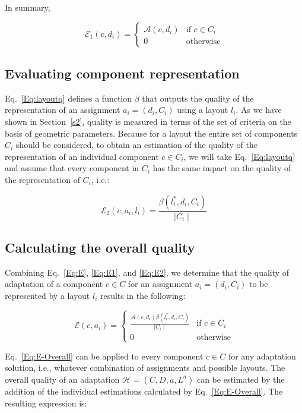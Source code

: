 In summary, 

\begin{equation} \label{Eq:E1}
\mathcal{E}_1(c,d_i)= \begin{cases}
\mathcal{A}(c,d_i) & \text{if $c \in C_i$} \\
0 & \text{otherwise}
\end{cases}
\end{equation}


\subsection{Evaluating component representation}

Eq.~\ref{Eq:layoutq} defines a function $\beta$ that outputs the quality of the representation of an assignment $a_i=(d_i,C_i)$ using a layout $l_i$. 
As we have shown in Section~\ref{s2}, quality is measured in terms of the set of criteria on the basis of geometric parameters. 
Because for a layout the entire set of components $C_i$ should be considered, to obtain an estimation of the quality of the representation of an individual component $c \in C_i$, we will take Eq.~\ref{Eq:layoutq}  and assume that every component in $C_i$ has the same impact on the quality of the representation of $C_i$, i.e.:

\begin{equation} \label{Eq:E2}
\mathcal{E}_2(c,a_i,l_i)= \frac{\beta(l^*_i,d_i,C_i)}{\mid C_i \mid}
\end{equation} 

\subsection{Calculating the overall quality}

Combining Eq.~\ref{Eq:E}, \ref{Eq:E1}, and \ref{Eq:E2}, we determine that the quality of adaptation of a component $c \in C$ for an assignment $a_i=(d_i,C_i)$ to be represented by a layout $l_i$ results in the following:

\begin{equation} \label{Eq:E-Overall}
\mathcal{E}(c,a_i) = \begin{cases}
\frac{\mathcal{A}(c,d_i) \beta(l^*_i,d_i,C_i)} {\mid C_i \mid} & \text{if $c \in C_i$} \\
0 & \text{otherwise}
\end{cases}
\end{equation} 

Eq.~\ref{Eq:E-Overall} can be applied to every component $c \in C$ for any adaptation solution, i.e., whatever combination of assignments and possible layouts. 
The overall quality of an adaptation $\mathcal{H}=(C,D,a,L^a)$ can be estimated by the addition of the individual estimations calculated by Eq.~\ref{Eq:E-Overall}. 
The resulting expression is:

